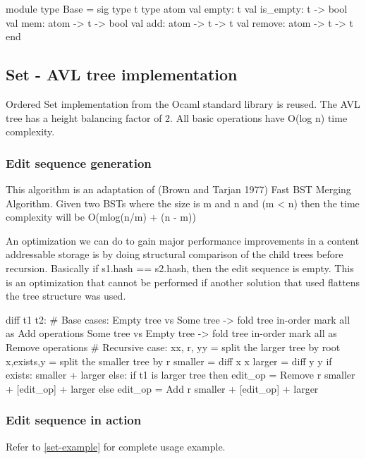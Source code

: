 \documentclass{article}
\begin{document}
\begin{longlisting}
module type Base = sig
  type t
  type atom
  val empty: t
  val is_empty: t -> bool
  val mem: atom -> t -> bool
  val add: atom -> t -> t
  val remove: atom -> t -> t
end
\end{longlisting}

\subsection{Set - AVL tree implementation}
Ordered Set implementation from the Ocaml standard library is reused. The AVL tree has a height balancing factor of 2. 
All basic operations have O(log n) time complexity.

\subsubsection{Edit sequence generation}\label{set-avlt-diff}
This algorithm is an adaptation of (Brown and Tarjan 1977) Fast BST Merging Algorithm. 
Given two BSTs where the size is m and n and (m < n) then the time complexity will be O(mlog(n/m) + (n - m))

An optimization we can do to gain major performance improvements in a content addressable storage 
is by doing structural comparison of the child trees before recursion. Basically if s1.hash == s2.hash, 
then the edit sequence is empty. This is an optimization that cannot be performed if another solution that used 
flattens the tree structure was used.

\begin{longlisting}[python]
diff t1 t2:
  # Base cases:
     Empty tree vs Some tree -> 
     	fold tree in-order 
     	  mark all as Add operations
     Some tree vs Empty tree ->
     	fold tree in-order 
     	  mark all as Remove operations
  # Recursive case:
     xx, r, yy = split the larger tree by root
     x,exists,y = split the smaller tree by r
     smaller = diff x x
  	 larger = diff y y
     if exists: 
     	smaller + larger
     else:
     	if t1 is larger tree then 
        	edit_op = Remove r
            smaller + [edit_op] + larger
        else 
        	edit_op = Add r
        	smaller + [edit_op] + larger
\end{longlisting}

\subsubsection{Edit sequence in action}
Refer to \ref{set-example} for complete usage example.
\end{document}
